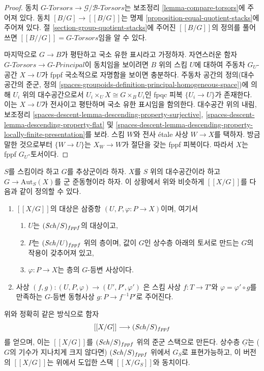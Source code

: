 \begin{proof}
동치 $G\textit{-Torsors} \to \mathcal{G}/\mathcal{B}\textit{-Torsors}$는
보조정리 \ref{lemma-compare-torsors}에 주어져 있다. 동치
$[B/G] \to [[B/G]]$는 명제 \ref{proposition-equal-quotient-stacks}에
주어져 있다. 절 \ref{section-group-quotient-stacks}에 주어진
$[[B/G]]$의 정의를 풀어 쓰면 $[[B//G]] = G\textit{-Torsors}$임을 알 수 있다.

\medskip\noindent
마지막으로 $G \to B$가 평탄하고 국소 유한 표시라고 가정하자. 자연스러운
함자 $G\textit{-Torsors} \to G\textit{-Principal}$이 동치임을 보이려면
$B$ 위의 스킴 $U$에 대하여 주동차 $G_U$-공간 $X \to U$가 fppf
국소적으로 자명함을 보이면 충분하다. 주동차 공간의 정의(대수공간의 준군,
정의 \ref{spaces-groupoids-definition-principal-homogeneous-space})에 의해
$U_i$ 위의 대수공간으로서 $U_i \times_U X \cong G \times_B U_i$인 fpqc 피복
$\{U_i \to U\}$가 존재한다. 이는 $X \to U$가 전사이고 평탄하며 국소 유한
표시임을 함의한다. 대수공간 위의 내림, 보조정리
\ref{spaces-descent-lemma-descending-property-surjective},
\ref{spaces-descent-lemma-descending-property-flat} 및
\ref{spaces-descent-lemma-descending-property-locally-finite-presentation}를
보라. 스킴 $W$와 전사 \'etale 사상 $W \to X$를 택하자. 방금 말한 것으로부터
$\{W \to U\}$는 $X_W \to W$가 절단을 갖는 fppf 피복이다. 따라서 $X$는
fppf $G_U$-토서이다.
\end{proof}

\begin{remark}
\label{remark-X-mod-G-group}
$S$를 스킴이라 하고 $G$를 추상군이라 하자. $X$를 $S$ 위의 대수공간이라
하고 $G \to \text{Aut}_S(X)$를 군 준동형이라 하자. 이 상황에서 위와
비슷하게 $[[X/G]]$를 다음과 같이 정의할 수 있다.
\begin{enumerate}
\item $[[X/G]]$의 대상은 삼중항 $(U, P, \varphi : P \to X)$이며, 여기서
\begin{enumerate}
\item $U$는 $(\mathit{Sch}/S)_{fppf}$의 대상이고,
\item $P$는 $(\mathit{Sch}/U)_{fppf}$ 위의 층이며, 값이 $G$인 상수층 아래의 토서로
만드는 $G$의 작용이 갖추어져 있고,
\item $\varphi : P \to X$는 층의 $G$-등변 사상이다.
\end{enumerate}
\item 사상
$(f, g) : (U, P, \varphi) \to (U', P', \varphi')$
은 스킴 사상 $f : T \to T'$와 $\varphi = \varphi' \circ g$를 만족하는
$G$-등변 동형사상 $g : P \to f^{-1}P'$로 주어진다.
\end{enumerate}
위와 정확히 같은 방식으로 함자
$$
[[X/G]] \longrightarrow (\mathit{Sch}/S)_{fppf}
$$
를 얻으며, 이는 $[[X/G]]$를 $(\mathit{Sch}/S)_{fppf}$ 위의 준군 스택으로 만든다.
상수층 $\underline{G}$는 ($G$의 기수가 지나치게 크지 않다면)
$(\mathit{Sch}/S)_{fppf}$ 위에서 $G_S$로 표현가능하고, 이 버전의 $[[X/G]]$는
위에서 도입한 스택 $[[X/G_S]]$와 동치이다.
\end{remark}






